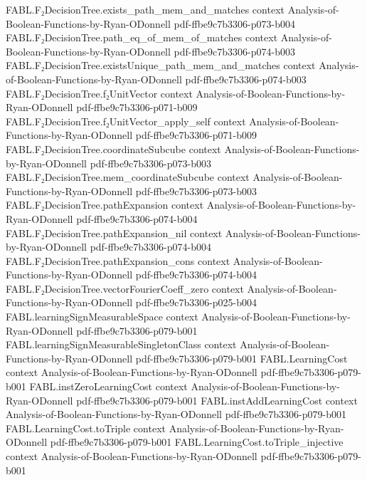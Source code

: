 \begin{theorem}
\proofstep
  {FABL.F₂DecisionTree.exists_path_mem_and_matches}
  {context}
  {Analysis-of-Boolean-Functions-by-Ryan-ODonnell}
  {pdf-ffbe9c7b3306-p073-b004}
\proofstep
  {FABL.F₂DecisionTree.path_eq_of_mem_of_matches}
  {context}
  {Analysis-of-Boolean-Functions-by-Ryan-ODonnell}
  {pdf-ffbe9c7b3306-p074-b003}
\proofstep
  {FABL.F₂DecisionTree.existsUnique_path_mem_and_matches}
  {context}
  {Analysis-of-Boolean-Functions-by-Ryan-ODonnell}
  {pdf-ffbe9c7b3306-p074-b003}
\proofstep
  {FABL.F₂DecisionTree.f₂UnitVector}
  {context}
  {Analysis-of-Boolean-Functions-by-Ryan-ODonnell}
  {pdf-ffbe9c7b3306-p071-b009}
\proofstep
  {FABL.F₂DecisionTree.f₂UnitVector_apply_self}
  {context}
  {Analysis-of-Boolean-Functions-by-Ryan-ODonnell}
  {pdf-ffbe9c7b3306-p071-b009}
\proofstep
  {FABL.F₂DecisionTree.coordinateSubcube}
  {context}
  {Analysis-of-Boolean-Functions-by-Ryan-ODonnell}
  {pdf-ffbe9c7b3306-p073-b003}
\proofstep
  {FABL.F₂DecisionTree.mem_coordinateSubcube}
  {context}
  {Analysis-of-Boolean-Functions-by-Ryan-ODonnell}
  {pdf-ffbe9c7b3306-p073-b003}
\proofstep
  {FABL.F₂DecisionTree.pathExpansion}
  {context}
  {Analysis-of-Boolean-Functions-by-Ryan-ODonnell}
  {pdf-ffbe9c7b3306-p074-b004}
\proofstep
  {FABL.F₂DecisionTree.pathExpansion_nil}
  {context}
  {Analysis-of-Boolean-Functions-by-Ryan-ODonnell}
  {pdf-ffbe9c7b3306-p074-b004}
\proofstep
  {FABL.F₂DecisionTree.pathExpansion_cons}
  {context}
  {Analysis-of-Boolean-Functions-by-Ryan-ODonnell}
  {pdf-ffbe9c7b3306-p074-b004}
\proofstep
  {FABL.F₂DecisionTree.vectorFourierCoeff_zero}
  {context}
  {Analysis-of-Boolean-Functions-by-Ryan-ODonnell}
  {pdf-ffbe9c7b3306-p025-b004}
\proofstep
  {FABL.learningSignMeasurableSpace}
  {context}
  {Analysis-of-Boolean-Functions-by-Ryan-ODonnell}
  {pdf-ffbe9c7b3306-p079-b001}
\proofstep
  {FABL.learningSignMeasurableSingletonClass}
  {context}
  {Analysis-of-Boolean-Functions-by-Ryan-ODonnell}
  {pdf-ffbe9c7b3306-p079-b001}
\proofstep
  {FABL.LearningCost}
  {context}
  {Analysis-of-Boolean-Functions-by-Ryan-ODonnell}
  {pdf-ffbe9c7b3306-p079-b001}
\proofstep
  {FABL.instZeroLearningCost}
  {context}
  {Analysis-of-Boolean-Functions-by-Ryan-ODonnell}
  {pdf-ffbe9c7b3306-p079-b001}
\proofstep
  {FABL.instAddLearningCost}
  {context}
  {Analysis-of-Boolean-Functions-by-Ryan-ODonnell}
  {pdf-ffbe9c7b3306-p079-b001}
\proofstep
  {FABL.LearningCost.toTriple}
  {context}
  {Analysis-of-Boolean-Functions-by-Ryan-ODonnell}
  {pdf-ffbe9c7b3306-p079-b001}
\proofstep
  {FABL.LearningCost.toTriple_injective}
  {context}
  {Analysis-of-Boolean-Functions-by-Ryan-ODonnell}
  {pdf-ffbe9c7b3306-p079-b001}

\end{theorem}

